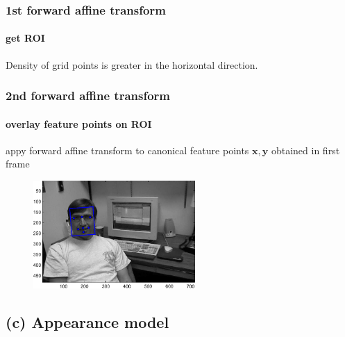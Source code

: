 \begin{frame}[plain]
\frametitle{1st forward affine transform}
\framesubtitle{get ROI}
\logoCSIPCPL\mypagenum
\begin{changemargin}{-1.3in}{0in}
Density of grid points is greater in the horizontal direction.
\begin{figure}[t]
\centering
{}
\end{figure}
\end{changemargin}
\end{frame}


\begin{frame}
\frametitle{2nd forward affine transform}
\framesubtitle{overlay feature points on ROI}
appy forward affine transform to canonical feature points $\mathbf{x,y}$ obtained in first frame
\logoCSIPCPL\mypagenum
\scriptsize
\begin{figure}[t]
\centering
\includegraphics[width=0.55\textwidth]{thesis/dataset_Dudek_with_feature_points_00001.pdf}
\label{Fig:overall}
\end{figure}
\end{frame}

\subsection{(c) Appearance model}

